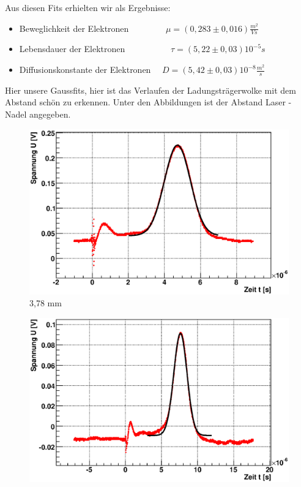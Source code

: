 \documentclass[12pt]{article}
\begin{document}
Aus diesen Fits erhielten wir als Ergebnisse:

\begin{itemize}
 \item Beweglichkeit der Elektronen ~~~~~~~~$\mu = (0,283 \pm 0,016) \frac{m^2}{Vs}$ 
 \item Lebensdauer der Elektronen ~~~~~~~~~~$\tau = (5,22 \pm 0,03) 10^{-5} s $
 \item Diffusionskonstante der Elektronen ~~$D = (5,42 \pm 0,03) 10^{-8} \frac{m^2}{s}$
\end{itemize}


\newpage
Hier unsere Gaussfits, hier ist das Verlaufen der Ladungsträgerwolke mit dem Abstand schön zu erkennen. Unter den Abbildungen ist der Abstand Laser - Nadel angegeben.

\begin{figure}[H]  
\begin{minipage}{0.33\linewidth}
\centering
\includegraphics[width=0.9\linewidth]{pictures/varDist/00.eps}
\small{3,78 mm}
\end{minipage}
\begin{minipage}{0.33\linewidth}
\centering
\includegraphics[width=0.9\linewidth]{pictures/varDist/09.eps}

\end{minipage}
\end{figure}
\end{document}
